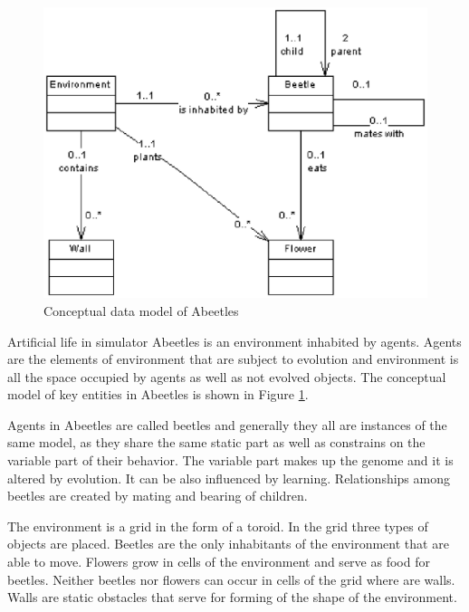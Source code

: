 \documentclass[a4paper,12pt]{report}
\begin{document}
\begin{figure}
\begin{center}
  \includegraphics [scale=0.8]{images/AnalysisDataModel.eps} 
  \caption{Conceptual data model of Abeetles}
  \label{obr.AnalysisDataModel}
\end{center}
\end{figure}

Artificial life in simulator Abeetles is an environment inhabited by agents. Agents are the elements of environment that are subject to evolution and environment is all the space occupied by agents as well as not evolved objects. The conceptual model of key entities in Abeetles is shown in Figure \ref{obr.AnalysisDataModel}.

Agents in Abeetles are called beetles and generally they all are instances of the same model, as they share the same static part as well as constrains on the variable part of their behavior. The variable part makes up the genome and it is altered by evolution. It can be also influenced by learning. Relationships among beetles are created by mating and bearing of children. 

The environment is a grid in the form of a toroid. In the grid three types of objects are placed. Beetles are the only inhabitants of the environment that are able to move. Flowers grow in cells of the environment and serve as food for beetles. Neither beetles nor flowers can occur in cells of the grid where are walls. Walls are static obstacles that serve for forming of the shape of the environment.
\end{document}
